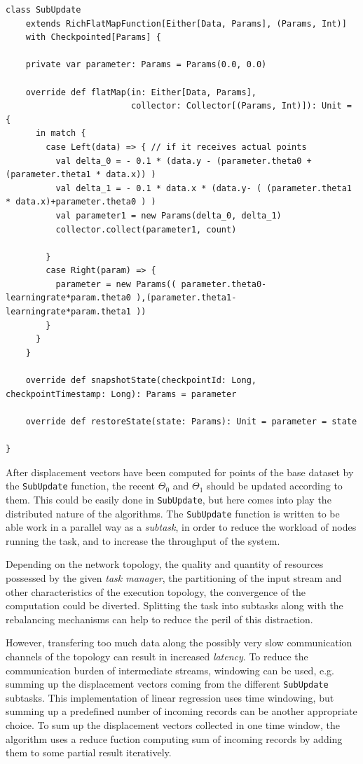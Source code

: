 {
\begin{verbatim}
class SubUpdate
    extends RichFlatMapFunction[Either[Data, Params], (Params, Int)]
    with Checkpointed[Params] {

    private var parameter: Params = Params(0.0, 0.0)
  
    override def flatMap(in: Either[Data, Params],
                         collector: Collector[(Params, Int)]): Unit = {
      in match {
        case Left(data) => { // if it receives actual points
          val delta_0 = - 0.1 * (data.y - (parameter.theta0 + (parameter.theta1 * data.x)) )   
          val delta_1 = - 0.1 * data.x * (data.y- ( (parameter.theta1 * data.x)+parameter.theta0 ) )
          val parameter1 = new Params(delta_0, delta_1)
          collector.collect(parameter1, count)

        }
        case Right(param) => {
          parameter = new Params(( parameter.theta0-learningrate*param.theta0 ),(parameter.theta1- learningrate*param.theta1 ))
        }
      }
    }

    override def snapshotState(checkpointId: Long, checkpointTimestamp: Long): Params = parameter

    override def restoreState(state: Params): Unit = parameter = state

}
\end{verbatim}
}

After displacement vectors have been computed for points of the base dataset by the \verb:SubUpdate: function, the recent $\Theta_0$ and $\Theta_1$ should be updated according to them. This could be easily done in \verb:SubUpdate:, but here comes into play the distributed nature of the algorithms. The \verb:SubUpdate: function is written to be able work in a parallel way as a \textit{subtask}, in order to reduce the workload of nodes running the task, and to increase the throughput of the system. 

Depending on the network topology, the quality and quantity of resources possessed by the given \textit{task manager}, the partitioning of the input stream and other characteristics of the execution topology, the convergence of the computation could be diverted. Splitting the task into subtasks along with the rebalancing mechanisms can help to reduce the peril of this distraction.

However, transfering too much data along the possibly very slow communication channels of the topology can result in increased \textit{latency}. To reduce the communication burden of intermediate streams, windowing can be used, e.g. summing up the displacement vectors coming from the different \verb:SubUpdate: subtasks. This implementation of linear regression uses time windowing, but summing up a predefined number of incoming records can be another appropriate choice.
To sum up the displacement vectors collected in one time window, the algorithm uses a reduce fuction computing sum of incoming records by adding them to some partial result iteratively.

